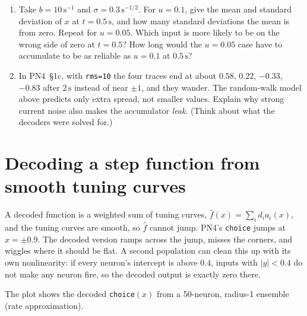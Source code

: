 \documentclass[11pt,letterpaper]{article}
\begin{document}
\begin{enumerate}
\item Take $b = 10\,\mathrm{s^{-1}}$ and $\sigma = 0.3\,\mathrm{s^{-1/2}}$. For $u = 0.1$, give the mean and standard deviation of $x$ at $t = 0.5\,\mathrm{s}$, and how many standard deviations the mean is from zero. Repeat for $u = 0.05$. Which input is more likely to be on the wrong side of zero at $t = 0.5$? How long would the $u = 0.05$ case have to accumulate to be as reliable as $u = 0.1$ at $0.5\,\mathrm{s}$?
\item In PN4~\S1c, with \texttt{rms=10} the four traces end at about $0.58$, $0.22$, $-0.33$, $-0.83$ after $2\,\mathrm{s}$ instead of near $\pm1$, and they wander. The random-walk model above predicts only extra spread, not smaller values. Explain why strong current noise also makes the accumulator \emph{leak}. (Think about what the decoders were solved for.)
\end{enumerate}

\section{Decoding a step function from smooth tuning curves}

\begin{idea}
A decoded function is a weighted sum of tuning curves, $\hat f(x) = \sum_i d_i a_i(x)$, and the tuning curves are smooth, so $\hat f$ cannot jump. PN4's \texttt{choice} jumps at $x = \pm 0.9$. The decoded version ramps across the jump, misses the corners, and wiggles where it should be flat. A second population can clean this up with its own nonlinearity: if every neuron's intercept is above $0.4$, inputs with $|y| < 0.4$ do not make any neuron fire, so the decoded output is exactly zero there.
\end{idea}

The plot shows the decoded \texttt{choice}$(x)$ from a 50-neuron, radius-1 ensemble (rate approximation).

\begin{center}
\end{center}
\end{document}

